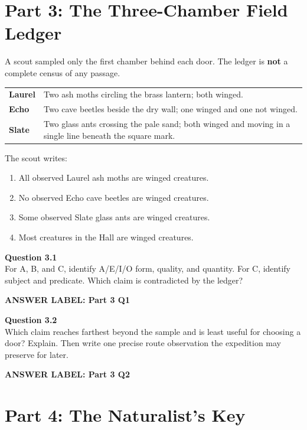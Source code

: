 \documentclass[12pt]{article}
\newcommand{\answerbox}[2]{%
\vspace{0.12em}\noindent\textbf{#1}\par\vspace{0.04em}
\noindent\fbox{\begin{minipage}[t][#2]{\dimexpr\textwidth-2\fboxsep-2\fboxrule}\rule{\textwidth}{0pt}\vspace{#2}\end{minipage}}\par\vspace{0.22em}}
\newcommand{\cluebox}[1]{%
\par\vspace{0.12em}\noindent\begin{minipage}{\textwidth}\itshape #1\end{minipage}\par\vspace{0.12em}}
\begin{document}
\newpage

\section*{Part 3: The Three-Chamber Field Ledger}

A scout sampled only the first chamber behind each door. The ledger is \textbf{not} a complete census of any passage.

\cluebox{
\begin{tabular}{>{\bfseries}p{}p{0.74\textwidth}}
Laurel & Two ash moths circling the brass lantern; both winged.\\
Echo & Two cave beetles beside the dry wall; one winged and one not winged.\\
Slate & Two glass ants crossing the pale sand; both winged and moving in a single line beneath the square mark.\\
\end{tabular}}

The scout writes:

\begin{enumerate}[label=\Alph*.,leftmargin=2em,itemsep=0.1em]
\item All observed Laurel ash moths are winged creatures.
\item No observed Echo cave beetles are winged creatures.
\item Some observed Slate glass ants are winged creatures.
\item Most creatures in the Hall are winged creatures.
\end{enumerate}

\textbf{Question 3.1}\\[-0.15em]
For A, B, and C, identify A/E/I/O form, quality, and quantity. For C, identify subject and predicate. Which claim is contradicted by the ledger?

\answerbox{ANSWER LABEL: Part 3 Q1}{2.2in}

\textbf{Question 3.2}\\[-0.15em]
Which claim reaches farthest beyond the sample and is least useful for choosing a door? Explain. Then write one precise route observation the expedition may preserve for later.

\answerbox{ANSWER LABEL: Part 3 Q2}{1.85in}

\newpage

\section*{Part 4: The Naturalist's Key}
\end{document}

